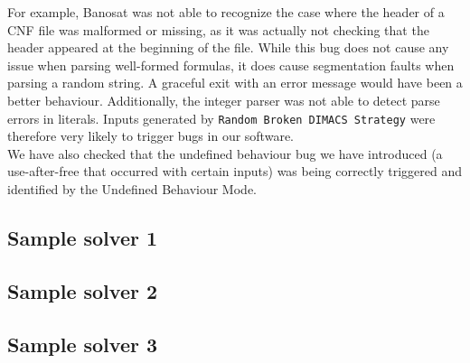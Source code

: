 \documentclass{article}
\begin{document}
For example, Banosat was not able to recognize the case where the header of a CNF file was malformed or missing,
as it was actually not checking that the header appeared at the beginning of the file. While this bug
does not cause any issue when parsing well-formed formulas, it does cause segmentation faults when parsing
a random string. A graceful exit with an error message would have been a better behaviour.
Additionally, the integer parser was not able to detect parse errors in literals. Inputs generated
by \verb|Random Broken DIMACS Strategy| were therefore very likely to trigger bugs in our software. \\

We have also checked that the undefined behaviour bug we have introduced (a use-after-free that occurred with certain
inputs) was being correctly triggered and identified by the Undefined Behaviour Mode. \\

\subsection{Sample solver 1}

\subsection{Sample solver 2}

\subsection{Sample solver 3}
\end{document}
